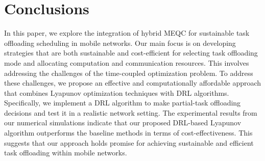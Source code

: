 \documentclass[journal]{IEEEtran}
\begin{document}
\section{Conclusions}
In this paper, we explore the integration of hybrid MEQC for sustainable task offloading scheduling in mobile networks. Our main focus is on developing strategies that are both sustainable and cost-efficient for selecting task offloading mode and allocating computation and communication resources. This involves addressing the challenges of the time-coupled  optimization problem.
To address these challenges, we propose an effective and computationally affordable approach that combines Lyapunov optimization techniques with DRL algorithms. Specifically, we implement a DRL algorithm to make partial-task offloading decisions and test it in a realistic network setting.
The experimental results from our numerical simulations indicate that our proposed DRL-based Lyapunov algorithm outperforms the baseline methods in terms of cost-effectiveness. This suggests that our approach holds promise for achieving sustainable and efficient task offloading within mobile networks.
\end{document}
